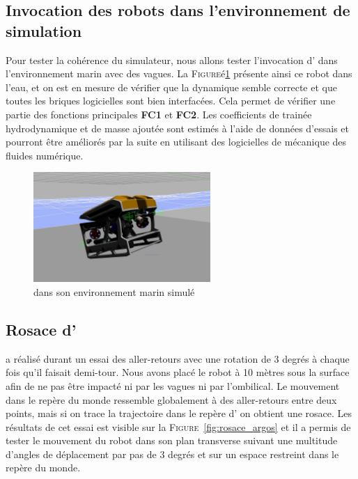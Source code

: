 		\subsection{Invocation des robots dans l'environnement de simulation}

			Pour tester la cohérence du simulateur, nous allons tester l'invocation d'\argos{} dans l'environnement marin avec des vagues. La \textsc{Figure}é\ref{fig:argos_sea} présente ainsi ce robot dans l'eau, et on est en mesure de vérifier que la dynamique semble correcte et que toutes les briques logicielles sont bien interfacées. Cela permet de vérifier une partie des fonctions principales \textbf{FC1} et \textbf{FC2}. Les coefficients de trainée hydrodynamique et de masse ajoutée sont estimés à l'aide de données d'essais et pourront être améliorés par la suite en utilisant des logicielles de mécanique des fluides numérique.

			\begin{figure}
				\centering
				\includegraphics[width=0.6\textwidth]{imgs/argos_gazebo_sea.jpg}
				\caption{\argos{} dans son environnement marin simulé}
				\label{fig:argos_sea}
			\end{figure}

		\subsection{Rosace d'\argos{}}

			\argos{} a réalisé durant un essai des aller-retours avec une rotation de 3 degrés à chaque fois qu'il faisait demi-tour. Nous avons placé le robot à 10 mètres sous la surface afin de ne pas être impacté ni par les vagues ni par l'ombilical. Le mouvement dans le repère du monde ressemble globalement à des aller-retours entre deux points, mais si on trace la trajectoire dans le repère d'\argos{} on obtient une rosace. Les résultats de cet essai est visible sur la \textsc{Figure}~\ref{fig:rosace_argos} et il a permis de tester le mouvement du robot dans son plan transverse suivant une multitude d'angles de déplacement par pas de 3 degrés et sur un espace restreint dans le repère du monde.

